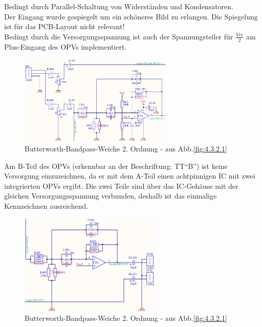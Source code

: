 Bedingt durch Parallel-Schaltung von Widerständen und Kondensatoren.\\ 
Der Eingang wurde gespiegelt um ein schöneres Bild zu erlangen.
Die Spiegelung ist für das PCB-Layout nicht relevant!\\
Bedingt durch die Versorgungsspannung ist auch der Spannungsteiler für $\frac{Vcc}{2}$ am Plus-Eingang des OPVs implementiert.
\begin{figure} [H]
	\centering	
	\includegraphics[width=0.65\textwidth]{img/Print4/4_TTuHTWeiche-LinksHP-SchematicV2.PNG}
	\caption{Butterworth-Bandpass-Weiche 2. Ordnung - aus Abb.\ref{fig:4.3.2.1}}
	\label {fig:4.3.2.2}
\end{figure}
Am B-Teil des OPVs (erkennbar an der Beschriftung: TT\enquote{B}) ist keine Versorgung einzuzeichnen, da er mit dem A-Teil einen achtpinnigen IC mit zwei integrierten OPVs ergibt.
Die zwei Teile sind über das IC-Gehäuse mit der gleichen Versorgungsspannung verbunden, deshalb ist das einmalige Kennzeichnen ausreichend.\\
\begin{figure} [H]
	\centering	
	\includegraphics[width=0.6\textwidth]{img/Print4/4_TTuHTWeiche-RechtsBP-SchematicV2.PNG}
	\caption{Butterworth-Bandpass-Weiche 2. Ordnung - aus Abb.\ref{fig:4.3.2.1}}
	\label {fig:4.3.2.3}
\end{figure}

\newpage
